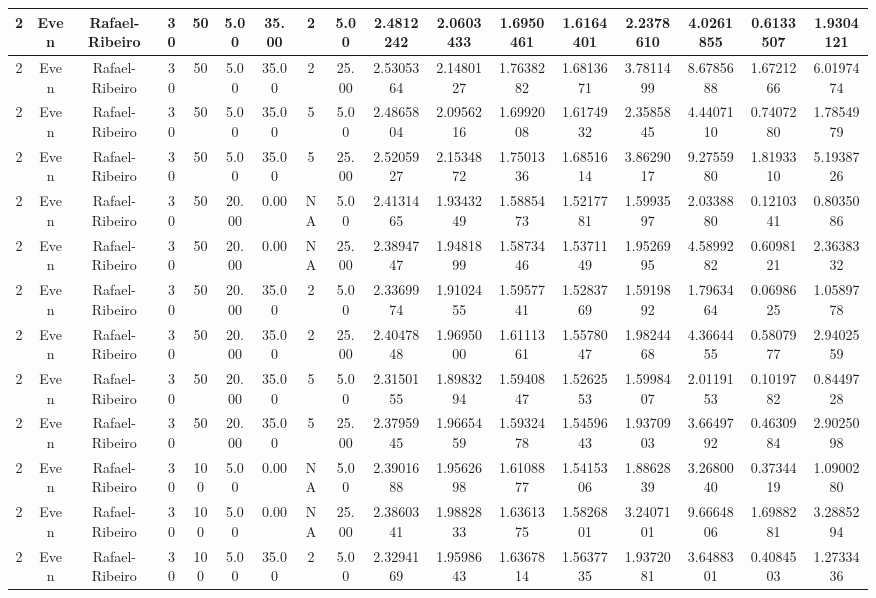 \begin{longtable}{ | c | c | c | c | c | c | c | c | c | c | c | c | c | c | c | c | c | }
	\hline
	2	&	Even	&	Rafael-Ribeiro	&	30	&	50	&	5.00	&	35.00	&	2	&	5.00	&	2.4812242	&	2.0603433	&	1.6950461	&	1.6164401	&	2.2378610	&	4.0261855	&	0.6133507	&	1.9304121 \\
	\hline
	2	&	Even	&	Rafael-Ribeiro	&	30	&	50	&	5.00	&	35.00	&	2	&	25.00	&	2.5305364	&	2.1480127	&	1.7638282	&	1.6813671	&	3.7811499	&	8.6785688	&	1.6721266	&	6.0197474 \\
	\hline
	2	&	Even	&	Rafael-Ribeiro	&	30	&	50	&	5.00	&	35.00	&	5	&	5.00	&	2.4865804	&	2.0956216	&	1.6992008	&	1.6174932	&	2.3585845	&	4.4407110	&	0.7407280	&	1.7854979 \\
	\hline
	2	&	Even	&	Rafael-Ribeiro	&	30	&	50	&	5.00	&	35.00	&	5	&	25.00	&	2.5205927	&	2.1534872	&	1.7501336	&	1.6851614	&	3.8629017	&	9.2755980	&	1.8193310	&	5.1938726 \\
	\hline
	2	&	Even	&	Rafael-Ribeiro	&	30	&	50	&	20.00	&	0.00	&	NA	&	5.00	&	2.4131465	&	1.9343249	&	1.5885473	&	1.5217781	&	1.5993597	&	2.0338880	&	0.1210341	&	0.8035086 \\
	\hline
	2	&	Even	&	Rafael-Ribeiro	&	30	&	50	&	20.00	&	0.00	&	NA	&	25.00	&	2.3894747	&	1.9481899	&	1.5873446	&	1.5371149	&	1.9526995	&	4.5899282	&	0.6098121	&	2.3638332 \\
	\hline
	2	&	Even	&	Rafael-Ribeiro	&	30	&	50	&	20.00	&	35.00	&	2	&	5.00	&	2.3369974	&	1.9102455	&	1.5957741	&	1.5283769	&	1.5919892	&	1.7963464	&	0.0698625	&	1.0589778 \\
	\hline
	2	&	Even	&	Rafael-Ribeiro	&	30	&	50	&	20.00	&	35.00	&	2	&	25.00	&	2.4047848	&	1.9695000	&	1.6111361	&	1.5578047	&	1.9824468	&	4.3664455	&	0.5807977	&	2.9402559 \\
	\hline
	2	&	Even	&	Rafael-Ribeiro	&	30	&	50	&	20.00	&	35.00	&	5	&	5.00	&	2.3150155	&	1.8983294	&	1.5940847	&	1.5262553	&	1.5998407	&	2.0119153	&	0.1019782	&	0.8449728 \\
	\hline
	2	&	Even	&	Rafael-Ribeiro	&	30	&	50	&	20.00	&	35.00	&	5	&	25.00	&	2.3795945	&	1.9665459	&	1.5932478	&	1.5459643	&	1.9370903	&	3.6649792	&	0.4630984	&	2.9025098 \\
	\hline
	2	&	Even	&	Rafael-Ribeiro	&	30	&	100	&	5.00	&	0.00	&	NA	&	5.00	&	2.3901688	&	1.9562698	&	1.6108877	&	1.5415306	&	1.8862839	&	3.2680040	&	0.3734419	&	1.0900280 \\
	\hline
	2	&	Even	&	Rafael-Ribeiro	&	30	&	100	&	5.00	&	0.00	&	NA	&	25.00	&	2.3860341	&	1.9882833	&	1.6361375	&	1.5826801	&	3.2407101	&	9.6664806	&	1.6988281	&	3.2885294 \\
	\hline
	2	&	Even	&	Rafael-Ribeiro	&	30	&	100	&	5.00	&	35.00	&	2	&	5.00	&	2.3294169	&	1.9598643	&	1.6367814	&	1.5637735	&	1.9372081	&	3.6488301	&	0.4084503	&	1.2733436 \\

\end{longtable}
